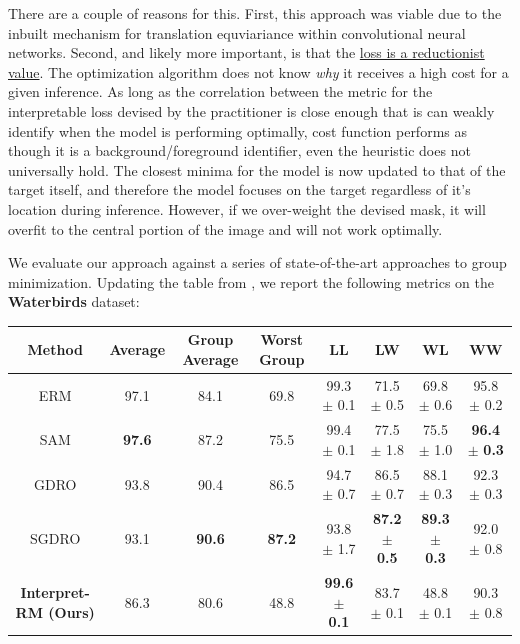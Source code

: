 \documentclass{article} %
\begin{document}
There are a couple of reasons for this. First, this approach was viable due to the inbuilt mechanism for translation equviariance within convolutional neural networks. Second, and likely more important, is that the \underline{loss is a reductionist value}. The optimization algorithm does not know \textit{why} it receives a high cost for a given inference. As long as the correlation between the metric for the interpretable loss devised by the practitioner is close enough that is can weakly identify when the model is performing optimally, cost function performs as though it is a background/foreground identifier, even the heuristic does not universally hold. The closest minima for the model is now updated to that of the target itself, and therefore the model focuses on the target regardless of it's location during inference. However, if we over-weight the devised mask, it will overfit to the central portion of the image and will not work optimally.

We evaluate our approach against a series of state-of-the-art approaches to group minimization. Updating the table from \citep{kim2022sharpnessaware}, we report the following metrics on the \textbf{Waterbirds} dataset:

\setlength\tabcolsep{3pt}
\begin{table}[h]
	\begin{adjustwidth}{-.5in}{-.5in}  
	\begin{tabular}{c|ccc|cccc}
		\toprule
		\textbf{Method}  & \textbf{Average}  & \textbf{Group Average}   & \textbf{Worst Group}    & \textbf{LL}                         & \textbf{LW}                         & \textbf{WL}                         & \textbf{WW}               \\
		\midrule
		ERM              & 97.1              & 84.1                     & 69.8                    & 99.3 $\pm$ 0.1                      & 71.5 $\pm$ 0.5                      & 69.8 $\pm$ 0.6                      & 95.8 $\pm$ 0.2            \\
		SAM              & \textbf{97.6}     & 87.2                     & 75.5                    & 99.4 $\pm$ 0.1             & 77.5 $\pm$ 1.8                      & 75.5 $\pm$ 1.0                      & \textbf{96.4} $\pm$ \textbf{0.3}   \\
		GDRO             & 93.8              & 90.4                     & 86.5                    & 94.7 $\pm$ 0.7                      & 86.5 $\pm$ 0.7                      & 88.1 $\pm$ 0.3                      & 92.3 $\pm$ 0.3            \\
		SGDRO            & 93.1              & \textbf{90.6}            & \textbf{87.2}           & 93.8 $\pm$ 1.7                      & \textbf{87.2} $\pm$ \textbf{0.5}    & \textbf{89.3} $\pm$ \textbf{0.3}    & 92.0 $\pm$ 0.8            \\
		\midrule
		\textbf{Interpret-RM (Ours)} & 86.3              & 80.6            & 48.8           & \textbf{99.6 $\pm$ 0.1}                      & 83.7 $\pm$ 0.1    & 48.8 $\pm$ 0.1    & 90.3 $\pm$ 0.8            \\
		\bottomrule
	\end{tabular}
\end{adjustwidth}
\end{table}
\end{document}

